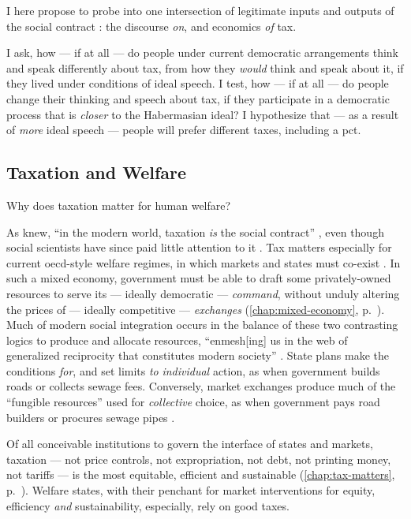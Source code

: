 I here propose to probe into one intersection of legitimate inputs and outputs of the social contract \citep[compare][]{Scharpf1997}:
the discourse \emph{on}, and economics \emph{of} tax.

I ask, how --- if at all --- do people under current democratic arrangements think and speak differently about tax, from how they \emph{would} think and speak about it, if they lived under conditions of ideal speech.
I test, how --- if at all --- do people change their thinking and speech about tax, if they participate in a democratic process that is \emph{closer} to the Habermasian ideal?
I hypothesize that --- as a result of \emph{more} ideal speech --- people will prefer different taxes, including a \gls{pct}.

\subsection{Taxation and Welfare}
Why does taxation matter for human welfare?

As \citeauthor{Schumpeter} knew, ``in the modern world, taxation \emph{is} the social contract'' \citep[1, emphasis in original]{Martin2009a}, even though social scientists have since paid little attention to it \citep[K191]{Tilly2009}.
Tax matters especially for current \gls{oecd}-style welfare regimes, in which markets and states must co-exist \citep{Stiglitz2011}.
In such a mixed economy, government must be able to draft some privately-owned resources to serve its --- ideally democratic --- \emph{command}, without unduly altering the prices of --- ideally competitive --- \emph{exchanges} \citep[165f]{Ardant1975} (\autoref{chap:mixed-economy}, p.~\pageref{chap:mixed-economy}).
Much of modern social integration occurs in the balance of these two contrasting logics to produce and allocate resources, ``enmesh[ing] us in the web of generalized reciprocity that constitutes modern society'' \citep[3]{Martin2009a}.
State plans make the conditions \emph{for}, and set limits \emph{to} \emph{individual} action, as when government builds roads or collects sewage fees.
Conversely, market exchanges produce much of the ``fungible resources'' used for \emph{collective} choice, as when government pays road builders or procures sewage pipes \cite[4]{Martin2009a}.

Of all conceivable institutions to govern the interface of states and markets, taxation --- not price controls, not expropriation, not debt, not printing money, not tariffs --- is the most equitable, efficient and sustainable \citep{MusgThet1959,Stiglitz2011} (\autoref{chap:tax-matters}, p.~\pageref{chap:tax-matters}).
Welfare states, with their penchant for market interventions for equity, efficiency \emph{and} sustainability, especially, rely on good taxes.

